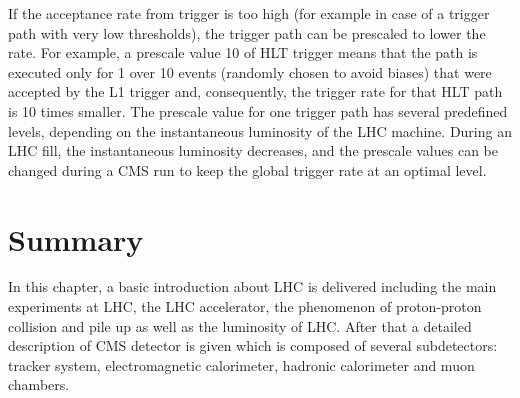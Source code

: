 If the acceptance rate from trigger is too high (for example in case of a trigger path with very low thresholds), the trigger path can be prescaled to lower the rate. For example, a prescale value 10 of HLT trigger means that the path is executed only for 1 over 10 events (randomly chosen to avoid biases) that were accepted by the L1 trigger and, consequently, the trigger rate for that HLT path is 10 times smaller. The prescale value for one trigger path has several predefined levels, depending on the instantaneous luminosity of the LHC machine. During an LHC fill, the instantaneous luminosity decreases, and the prescale values can be changed during a CMS run to keep the global trigger rate at an optimal level.

\section{Summary}\label{subsec:LHC_CMS_Summary}

In this chapter, a basic introduction about LHC is delivered including the main experiments at LHC, the LHC accelerator, the phenomenon of proton-proton collision and pile up as well as the luminosity of LHC. After that a detailed description of CMS detector is given which is composed of several subdetectors: tracker system, electromagnetic calorimeter, hadronic calorimeter and muon chambers.
